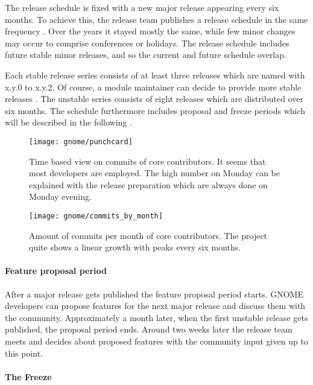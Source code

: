 The release schedule is fixed with a new major release appearing every six
months. To achieve this, the release team publishes a release schedule in the
same frequency \cite{GNOMEDevelopmentSchedule}. Over the years it stayed mostly
the same, while few minor changes may occur to comprise conferences or
holidays. The release schedule includes future stable minor releases, and so
the current and future schedule overlap.

Each stable release series consists of at least three releases which are named
with x.y.0 to x.y.2. Of course, a module maintainer can decide to provide more
stable releases \cite{GNOMEReleaseTeam}. The unstable series consists of eight
releases which are distributed over six months. The schedule furthermore
includes proposal and freeze periods which will be described in the following
\cite{GNOMEDevelopmentSchedule,GNOMESchedule}.

\begin{figure}[bhtp]
  \centering
  \texttt{[image: gnome/punchcard]}
  \caption[Time Based View on Commits, GNOME]
  {Time based view on commits of core contributors. It seems that most
    developers are employed. The high number on Monday can be explained with
    the release preparation which are always done on Monday evening.}
  \label{fig:gnome:p}
\end{figure}

\begin{figure}[htbp]
  \centering
  \texttt{[image: gnome/commits\_by\_month]}
  \caption[Commits by Month, GNOME]
  {Amount of commits per month of core contributors. The project quite shows a
    linear growth with peaks every six months.}
  \label{fig:gnome:cbm}
\end{figure}

\paragraph{Feature proposal period}

After a major release gets published the feature proposal period starts. GNOME
developers can propose features for the next major release and discuss them
with the community. Approximately a month later, when the first unstable
release gets published, the proposal period ends. Around two weeks later the
release team meets and decides about proposed features with the community input
given up to this point.

\paragraph{The Freeze}

